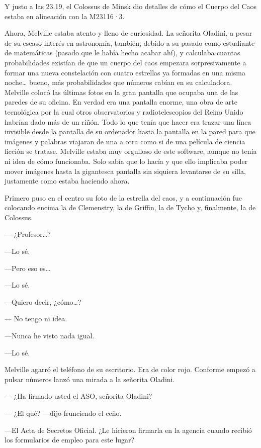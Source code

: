 Y justo a las 23.19, el Colossus de Minsk dio detalles de cómo el Cuerpo
del Caos estaba en alineación con la M23116·3.

Ahora, Melville estaba atento y lleno de curiosidad. La señorita
Oladini, a pesar de su escaso interés en astronomía, también, debido a
su pasado como estudiante de matemáticas (pasado que le había hecho
acabar ahí), y calculaba cuantas probabilidades existían de que un
cuerpo del caos empezara sorpresivamente a formar una nueva constelación
con cuatro estrellas ya formadas en una misma noche\ldots{} bueno, más
probabilidades que números cabían en su calculadora. Melville colocó las
últimas fotos en la gran pantalla que ocupaba una de las paredes de su
oficina. En verdad era una pantalla enorme, una obra de arte tecnológica
por la cual otros observatorios y radiotelescopios del Reino Unido
habrían dado más de un riñón. Todo lo que tenía que hacer era trazar una
línea invisible desde la pantalla de su ordenador hasta la pantalla en
la pared para que imágenes y   palabras viajaran de una a otra como si de
una película de ciencia ficción se tratase. Melville estaba muy
orgulloso de este software, aunque no tenía ni idea de cómo funcionaba.
Solo sabía que lo hacía y que ello implicaba poder mover imágenes hasta
la gigantesca pantalla sin siquiera levantarse de su silla, justamente
como estaba haciendo ahora.

Primero puso en el centro su foto de la estrella del caos, y a
continuación fue colocando encima la de Clemenstry, la de Griffin, la de
Tycho y, finalmente, la de Colossus.

--- ¿Profesor\ldots{}?

---Lo sé.

---Pero eso es\ldots{}

---Lo sé.

---Quiero decir, ¿cómo\ldots{}?

---  No tengo ni idea.

---Nunca he visto nada igual.

---Lo sé.

Melville agarró el teléfono de su escritorio. Era de color rojo.
Conforme empezó a pulsar números lanzó una mirada a la señorita Oladini.

---  ¿Ha firmado usted el ASO, señorita Oladini?

---  ¿El qué? ---dijo frunciendo el ceño.

---El Acta de Secretos Oficial. ¿Le hicieron firmarla en la agencia
cuando recibió los formularios de empleo para este lugar?

